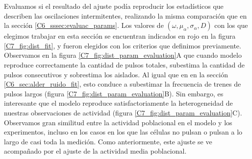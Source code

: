 \documentclass[./main.tex]{subfiles}
\begin{document}
Evaluamos si el resultado del ajuste podía reproducir los estadísticos que describen las oscilaciones intermitentes, realizando la misma comparación que en la sección \ref{C6_sssec:evaluac_params}. Los valores de $(\omega,\mu_{\alpha},\sigma_{\alpha},D)$ con los que elegimos trabajar en esta sección se encuentran indicados en rojo en la figura \ref{C7_fig:dist_fit}, y fueron elegidos con los criterios que definimos previamente. Observamos en la figura \ref{C7_fig:dist_param_evaluation}A que cuando modelo reproduce correctamente la cantidad de pulsos totales, subestima la cantidad de pulsos consecutivos y sobrestima los aislados. Al igual que en en la sección \ref{C6_sec:alder_ruido_fit}, esto conduce a subestimar la frecuencia de trenes de pulsos largos (figura \ref{C7_fig:dist_param_evaluation}B). Sin embargo, es interesante que el modelo reproduce satisfactoriamente la heterogeneidad de nuestras observaciones de actividad (figura \ref{C7_fig:dist_param_evaluation}C). Observamos gran similitud entre la actividad poblacional en el modelo y los experimentos, incluso en los casos en los que las células no pulsan o pulsan a lo largo de casi toda la medición. Como anteriormente, este ajuste se ve acompañado por el ajuste de la actividad media poblacional.
\end{document}
